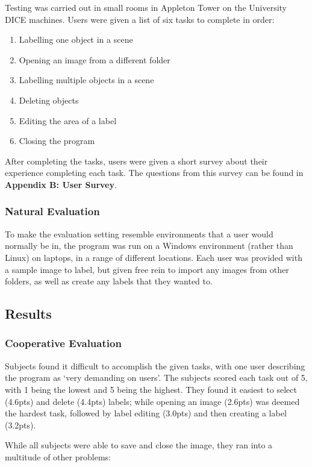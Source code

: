 \documentclass[11pt,twocolumn]{article}
\begin{document}
Testing was carried out in small rooms in Appleton Tower on the University DICE machines. Users were given a list of six tasks to complete in order: 

\begin{enumerate}
\item Labelling one object in a scene
\item Opening an image from a different folder
\item Labelling multiple objects in a scene
\item Deleting objects
\item Editing the area of a label
\item Closing the program
\end{enumerate}
 
After completing the tasks, users were given a short survey about their experience completing each task. The questions from this survey can be found in {\bf Appendix B: User Survey}.

\subsubsection{Natural Evaluation}

To make the evaluation setting resemble environments that a user would normally be in, the program was run on a Windows environment (rather than Linux) on laptops, in a range of different locations. Each user was provided with a sample image to label, but given free rein to import any images from other folders, as well as create any labels that they wanted to.  

\subsection{Results}

\subsubsection{Cooperative Evaluation}

Subjects found it difficult to accomplish the given tasks, with one user describing the program as `very demanding on users'. The subjects scored each task out of 5, with 1 being the lowest and 5 being the highest. They found it easiest to select (4.6pts) and delete (4.4pts) labels; while opening an image (2.6pts) was deemed the hardest task, followed by label editing (3.0pts) and then creating a label (3.2pts).

While all subjects were able to save and close the image, they ran into a multitude of other problems:
 
\end{document}

